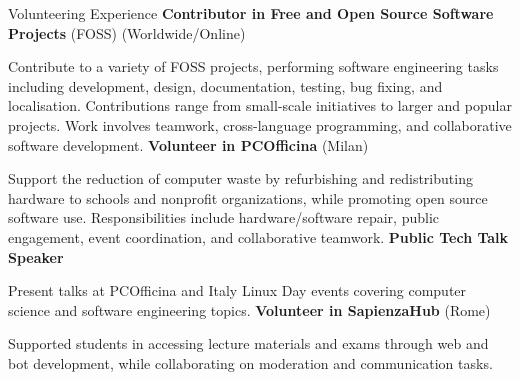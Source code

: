 \vspace{-1em}
\begin{rubric}{Volunteering Experience}
	\entry*[2015 -- Present] \textbf{Contributor in Free and Open Source Software Projects} (FOSS) (Worldwide/Online)
	
	Contribute to a variety of FOSS projects, performing software engineering tasks including development, design, documentation, testing, bug fixing, and localisation. Contributions range from small-scale initiatives to larger and popular projects. Work involves teamwork, cross-language programming, and collaborative software development.
	\entry*[2022 -- Present] \textbf{Volunteer in PCOfficina} (Milan)
	
	Support the reduction of computer waste by refurbishing and redistributing hardware to schools and nonprofit organizations, while promoting open source software use. Responsibilities include hardware/software repair, public engagement, event coordination, and collaborative teamwork.
	\entry*[2017 -- Present] \textbf{Public Tech Talk Speaker}
	
	Present talks at PCOfficina and Italy Linux Day events covering computer science and software engineering topics.
	\entry*[2019 -- 2021] \textbf{Volunteer in SapienzaHub} (Rome)
	
	Supported students in accessing lecture materials and exams through web and bot development, while collaborating on moderation and communication tasks.
\end{rubric}